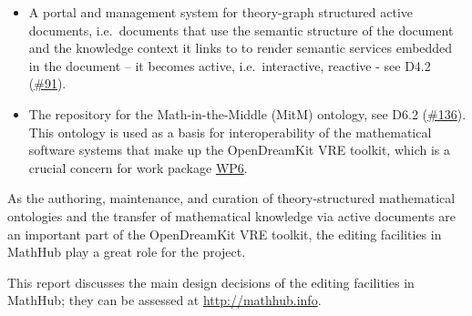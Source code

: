 \begin{itemize}
\item
  A portal and management system for theory-graph structured active
  documents, i.e.~documents that use the semantic structure of the
  document and the knowledge context it links to to render semantic
  services embedded in the document -- it becomes active,
  i.e.~interactive, reactive - see D4.2
  (\href{https://github.com/OpenDreamKit/OpenDreamKit/issues/91}{\#91}).
\item
  The repository for the Math-in-the-Middle (MitM) ontology, see D6.2
  (\href{https://github.com/OpenDreamKit/OpenDreamKit/issues/136}{\#136}).
  This ontology is used as a basis for interoperability of the
  mathematical software systems that make up the OpenDreamKit VRE
  toolkit, which is a crucial concern for work package
  \href{https://github.com/OpenDreamKit//OpenDreamKit/tree/master/WP6}{WP6}.
\end{itemize}

As the authoring, maintenance, and curation of theory-structured
mathematical ontologies and the transfer of mathematical knowledge via
active documents are an important part of the OpenDreamKit VRE toolkit,
the editing facilities in MathHub play a great role for the project.

This report discusses the main design decisions of the editing
facilities in MathHub; they can be assessed at
\url{http://mathhub.info}.
